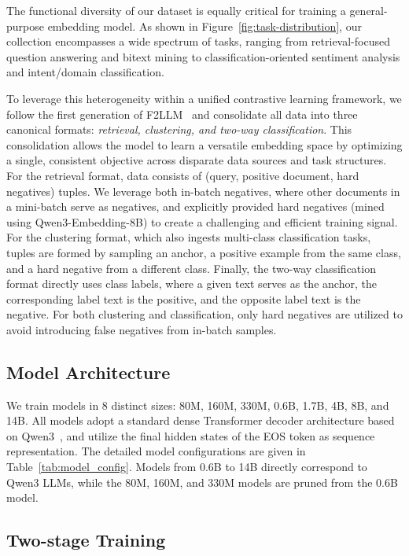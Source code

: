 The functional diversity of our dataset is equally critical for training a general-purpose embedding model. As shown in Figure~\ref{fig:task-distribution}, our collection encompasses a wide spectrum of tasks, ranging from retrieval-focused question answering and bitext mining to classification-oriented sentiment analysis and intent/domain classification.

To leverage this heterogeneity within a unified contrastive learning framework, we follow the first generation of F2LLM~\citep{2025f2llm} and consolidate all data into three canonical formats: \emph{retrieval, clustering, and two-way classification}. This consolidation allows the model to learn a versatile embedding space by optimizing a single, consistent objective across disparate data sources and task structures. For the retrieval format, data consists of (query, positive document, hard negatives) tuples. We leverage both in-batch negatives, where other documents in a mini-batch serve as negatives, and explicitly provided hard negatives (mined using Qwen3-Embedding-8B) to create a challenging and efficient training signal. For the clustering format, which also ingests multi-class classification tasks, tuples are formed by sampling an anchor, a positive example from the same class, and a hard negative from a different class. Finally, the two-way classification format directly uses class labels, where a given text serves as the anchor, the corresponding label text is the positive, and the opposite label text is the negative. For both clustering and classification, only hard negatives are utilized to avoid introducing false negatives from in-batch samples.



\subsection{Model Architecture}

We train models in 8 distinct sizes: 80M, 160M, 330M, 0.6B, 1.7B, 4B, 8B, and 14B. All models adopt a standard dense Transformer decoder architecture based on Qwen3~\citep{2025Qwen3}, and utilize the final hidden states of the EOS token as sequence representation. The detailed model configurations are given in Table~\ref{tab:model_config}. Models from 0.6B to 14B directly correspond to Qwen3 LLMs, while the 80M, 160M, and 330M models are pruned from the 0.6B model.

\subsection{Two-stage Training}\label{sec:method-training}

